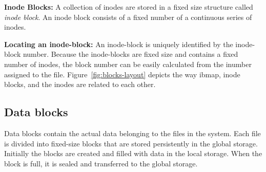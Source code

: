 \documentclass[]{article}
\newcommand{\subtopic}[1]{\vspace{1.5pt} \noindent \textbf{#1}}
\begin{document}
\subtopic{Inode Blocks:} A collection of inodes are stored in a fixed size
structure called \textit{inode block}. An inode block consists of a fixed
number of a continuous series of inodes. 


\subtopic{Locating an inode-block:} An inode-block is uniquely identified by
the inode-block number.  Because the inode-blocks are fixed size and contains a
fixed number of inodes, the block number can be easily calculated from the
inumber assigned to the file.
Figure~\ref{fig:blocks-layout} depicts the way ibmap, inode blocks, and the
inodes are related to each other.




\subsection{Data blocks}

Data blocks contain the actual data belonging to the files in the system.
Each file is divided into fixed-size blocks that are stored persistently in
the global storage. Initially the blocks are created and filled with data
in the local storage. When the block is full, it is sealed and transferred 
to the global storage. 
\end{document}
